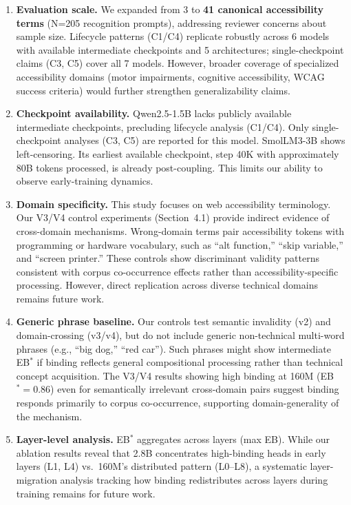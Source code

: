 \documentclass[10pt]{article} %
\begin{document}
\begin{enumerate}
  \item \textbf{Evaluation scale.} We expanded from 3 to \textbf{41 canonical accessibility terms} (N=205 recognition prompts), addressing reviewer concerns about sample size. Lifecycle patterns (C1/C4) replicate robustly across 6 models with available intermediate checkpoints and 5 architectures; single-checkpoint claims (C3, C5) cover all 7 models. However, broader coverage of specialized accessibility domains (motor impairments, cognitive accessibility, WCAG success criteria) would further strengthen generalizability claims.

  \item \textbf{Checkpoint availability.} Qwen2.5-1.5B lacks publicly available intermediate checkpoints, precluding lifecycle analysis (C1/C4). Only single-checkpoint analyses (C3, C5) are reported for this model. SmolLM3-3B shows left-censoring. Its earliest available checkpoint, step 40K with approximately 80B tokens processed, is already post-coupling. This limits our ability to observe early-training dynamics.

  \item \textbf{Domain specificity.} This study focuses on web accessibility terminology. Our V3/V4 control experiments (Section~4.1) provide indirect evidence of cross-domain mechanisms. Wrong-domain terms pair accessibility tokens with programming or hardware vocabulary, such as ``alt function,'' ``skip variable,'' and ``screen printer.'' These controls show discriminant validity patterns consistent with corpus co-occurrence effects rather than accessibility-specific processing. However, direct replication across diverse technical domains remains future work.

  \item \textbf{Generic phrase baseline.} Our controls test semantic invalidity (v2) and domain-crossing (v3/v4), but do not include generic non-technical multi-word phrases (e.g., ``big dog,'' ``red car''). Such phrases might show intermediate EB$^*$ if binding reflects general compositional processing rather than technical concept acquisition. The V3/V4 results showing high binding at 160M (EB$^*=0.86$) even for semantically irrelevant cross-domain pairs suggest binding responds primarily to corpus co-occurrence, supporting domain-generality of the mechanism.

  \item \textbf{Layer-level analysis.} EB$^*$ aggregates across layers (max EB). While our ablation results reveal that 2.8B concentrates high-binding heads in early layers (L1, L4) vs.\ 160M's distributed pattern (L0--L8), a systematic layer-migration analysis tracking how binding redistributes across layers during training remains for future work.


\end{enumerate}
\end{document}
